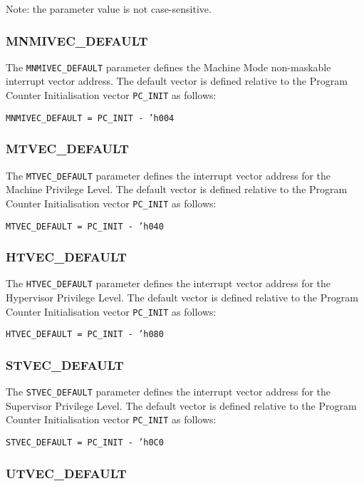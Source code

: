 Note: the parameter value is not case-sensitive.

\subsubsection{MNMIVEC\_DEFAULT}\label{mnmivec_default}

The \texttt{MNMIVEC\_DEFAULT} parameter defines the Machine Mode non-maskable
interrupt vector address. The default vector is defined relative to the
Program Counter Initialisation vector \texttt{PC\_INIT} as follows:

\texttt{MNMIVEC\_DEFAULT = PC\_INIT - 'h004}

\subsubsection{MTVEC\_DEFAULT}\label{mtvec_default}

The \texttt{MTVEC\_DEFAULT} parameter defines the interrupt vector address for
the Machine Privilege Level. The default vector is defined relative to
the Program Counter Initialisation vector \texttt{PC\_INIT} as follows:

\texttt{MTVEC\_DEFAULT = PC\_INIT - 'h040}

\subsubsection{HTVEC\_DEFAULT}\label{htvec_default}

The \texttt{HTVEC\_DEFAULT} parameter defines the interrupt vector address for
the Hypervisor Privilege Level. The default vector is defined relative
to the Program Counter Initialisation vector \texttt{PC\_INIT} as follows:

\texttt{HTVEC\_DEFAULT = PC\_INIT - 'h080}

\subsubsection{STVEC\_DEFAULT}\label{stvec_default}

The \texttt{STVEC\_DEFAULT} parameter defines the interrupt vector address for
the Supervisor Privilege Level. The default vector is defined relative
to the Program Counter Initialisation vector \texttt{PC\_INIT} as follows:

\texttt{STVEC\_DEFAULT = PC\_INIT - 'h0C0}

\subsubsection{UTVEC\_DEFAULT}\label{utvec_default}


